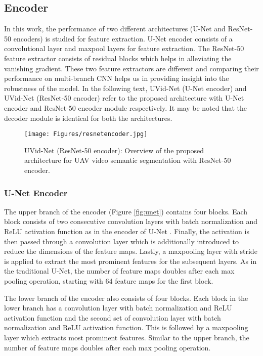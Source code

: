 \documentclass[journal]{IEEEtran}
\begin{document}
\subsection{Encoder}  
\label{SubSec:Encoder}
\par 
In this work, the performance of two different architectures (U-Net and ResNet-50 encoders) is studied for feature extraction. U-Net encoder consists of a convolutional layer and maxpool layers for feature extraction. The ResNet-50 feature extractor consists of residual blocks which helps in alleviating the vanishing gradient. These two feature extractors are different and comparing their performance on multi-branch CNN helps us in providing insight into the robustness of the model. In the following text, UVid-Net (U-Net encoder) and UVid-Net (ResNet-50 encoder) refer to the proposed architecture with U-Net encoder and ResNet-50 encoder module respectively. It may be noted that the decoder module is identical for both the architectures. 


\begin{figure}[h]
	\begin{center}
		\texttt{[image: Figures/resnetencoder.jpg]}
\end{center}
	\caption{UVid-Net (ResNet-50 encoder): Overview of the proposed architecture for UAV video semantic segmentation with ResNet-50 encoder.}
	\label{fig:res}
\end{figure} 

\subsubsection{U-Net Encoder} 
\par The upper branch of the encoder (Figure \ref{fig:unet}) contains four blocks. Each block consists of two consecutive  convolution layers with batch normalization and ReLU activation function as in the encoder of U-Net \cite{26}. Finally, the activation is then passed through a  convolution layer which is additionally introduced to reduce the dimensions of the feature maps. Lastly, a maxpooling layer with stride  is applied to extract the most prominent features for the subsequent layers. As in the traditional U-Net, the number of feature maps doubles after each max pooling operation, starting with 64 feature maps for the first block.  



The lower branch of the encoder also consists of four blocks. Each block in the lower branch has a  convolution layer with batch normalization and ReLU activation function and the second set of  convolution layer with batch normalization and ReLU activation function. This is followed by a maxpooling layer which extracts most prominent features.  Similar to the upper branch, the number of feature maps doubles after each max pooling operation. 
\end{document}
